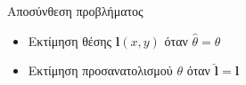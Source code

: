 \begin{frame}{Αποσύνθεση προβλήματος}

  \begin{itemize}
    \item Εκτίμηση θέσης $\bm{l}(x,y)$ \hspace{7.5ex} όταν $\hat{\theta} = \theta$
    \item Εκτίμηση προσανατολισμού $\theta$ \hspace{1ex} όταν $\hat{\bm{l}} = \bm{l}$
  \end{itemize}




\end{frame}
